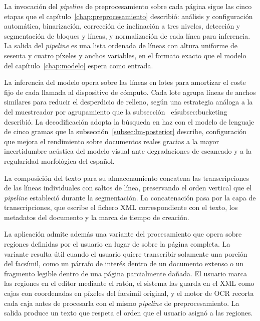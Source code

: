 La invocación del \textit{pipeline} de preprocesamiento sobre cada página sigue las cinco etapas que el capítulo~\ref{chap:preprocesamiento} describió: análisis y configuración automática, binarización, corrección de inclinación a tres niveles, detección y segmentación de bloques y líneas, y normalización de cada línea para inferencia. La salida del \textit{pipeline} es una lista ordenada de líneas con altura uniforme de sesenta y cuatro píxeles y anchos variables, en el formato exacto que el modelo del capítulo~\ref{chap:modelo} espera como entrada.

La inferencia del modelo opera sobre las líneas en lotes para amortizar el coste fijo de cada llamada al dispositivo de cómputo. Cada lote agrupa líneas de anchos similares para reducir el desperdicio de relleno, según una estrategia análoga a la del muestreador por agrupamiento que la subsección~
ef{subsec:bucketing} describió. La decodificación adopta la búsqueda en haz con el modelo de lenguaje de cinco gramas que la subsección~\ref{subsec:lm-posterior} describe, configuración que mejora el rendimiento sobre documentos reales gracias a la mayor incertidumbre acústica del modelo visual ante degradaciones de escaneado y a la regularidad morfológica del español.

La composición del texto para su almacenamiento concatena las transcripciones de las líneas individuales con saltos de línea, preservando el orden vertical que el \textit{pipeline} estableció durante la segmentación. La concatenación pasa por la capa de transcripciones, que escribe el fichero XML correspondiente con el texto, los metadatos del documento y la marca de tiempo de creación.

La aplicación admite además una variante del procesamiento que opera sobre regiones definidas por el usuario en lugar de sobre la página completa. La variante resulta útil cuando el usuario quiere transcribir solamente una porción del facsímil, como un párrafo de interés dentro de un documento extenso o un fragmento legible dentro de una página parcialmente dañada. El usuario marca las regiones en el editor mediante el ratón, el sistema las guarda en el XML como cajas con coordenadas en píxeles del facsímil original, y el motor de OCR recorta cada caja antes de procesarla con el mismo \textit{pipeline} de preprocesamiento. La salida produce un texto que respeta el orden que el usuario asignó a las regiones.

